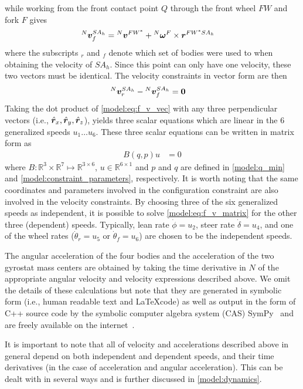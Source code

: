 while working from the front contact point $Q$ through the front wheel $FW$ and
fork $F$ gives
\begin{align}
  {}^{N}\boldsymbol{v}^{SA_h}_f &= {}^{N}\boldsymbol{v}^{FW^*} + {}^{N}\boldsymbol{\omega}^{F} \times \boldsymbol{r}^{FW^*SA_h}
\end{align}
where the subscripts $_r$ and $_f$ denote which set of bodies were used to when
obtaining the velocity of $SA_h$. Since this point can only have one velocity,
these two vectors must be identical. The velocity constraints in vector form
are then
\begin{align}
  {}^{N}\boldsymbol{v}^{SA_h}_r - {}^{N}\boldsymbol{v}^{SA_h}_f &= \boldsymbol{0}
  \label{model:eq:f_v_vec}
\end{align}
Taking the dot product of \autoref{model:eq:f_v_vec} with any three
perpendicular vectors (i.e., $\hat{\boldsymbol{r}}_{x}, \hat{\boldsymbol{r}}_{y}, \hat{\boldsymbol{r}}_{z}$), yields three
scalar equations which are linear in the 6 generalized speeds $u_1 \dots u_6$.
These three scalar equations can be written in matrix form as
\begin{align}
  B(q, p) u &= 0
  \label{model:eq:f_v_matrix}
\end{align}
where $B:\mathbb{R}^3 \times \mathbb{R}^7 \mapsto \mathbb{R}^{3 \times 6}$,
$u\in\mathbb{R}^{6 \times 1}$ and $p$ and $q$ are defined in
\autoref{model:q_min} and \autoref{model:constraint_parameters}, respectively.
It is worth noting that the same coordinates and parameters involved in the
configuration constraint are also involved in the velocity constraints. By
choosing three of the six generalized speeds as independent, it is possible to
solve \autoref{model:eq:f_v_matrix} for the other three (dependent) speeds.
Typically, lean rate $\dot{\phi} = u_2$, steer rate $\dot{\delta} = u_4$, and
one of the wheel rates ($\dot{\theta}_r = u_5$ or $\dot{\theta}_f = u_6$) are
chosen to be the independent speeds.

The angular acceleration of the four bodies and the acceleration of the two
gyrostat mass centers are obtained by taking the time derivative in $N$ of the
appropriate angular velocity and velocity expressions described above. We omit
the details of these calculations but note that they are generated in symbolic
form (i.e., human readable text and \LaTeX code) as well as output in the form
of C++ source code by the symbolic computer algebra system (CAS) SymPy~\cite{SymPy}
and are freely available on the internet~\cite{libbicycle}.

It is important to note that all of velocity and accelerations described above
in general depend on both independent and dependent speeds, and their time
derivatives (in the case of acceleration and angular acceleration). This can be
dealt with in several ways and is further discussed in \autoref{model:dynamics}.

